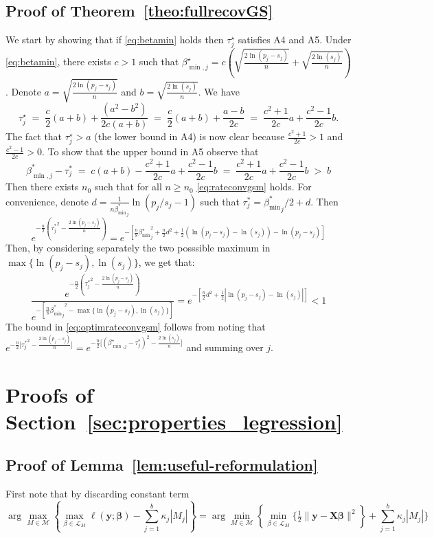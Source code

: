 \documentclass[aos]{imsart}
\theoremstyle{plain}
\newcommand{\bs}{\boldsymbol}
\begin{document}
\begin{supplement}
\subsection{Proof of Theorem~\ref{theo:fullrecovGS}}
We start by showing that if \eqref{eq:betamin} holds then $\tau^\star_j$ satisfies A4 and A5. Under \eqref{eq:betamin}, there exists $c>1$ such that $\beta^\star_{\min,j}=c(\sqrt{\tfrac{2\ln(p_j-s_j)}{n}} + \sqrt{\tfrac{2\ln(s_j)}{n}})$. Denote $a=\sqrt{\tfrac{2\ln(p_j-s_j)}{n}}$ and $b=\sqrt{\tfrac{2\ln(s_j)}{n}}$. We have
$$
\tau_j^\star\;=\;\frac{c}{2} (a+b)+\frac{(a^2-b^2)}{2c(a+b)}\;=\;\frac{c}{2} (a+b)+\frac{a-b}{2c}\;=\;\frac{c^2+1}{2c}a+\frac{c^2-1}{2c}b.
$$
The fact that $\tau^\star_j>a$ (the lower bound in A4) is now clear because $\tfrac{c^2+1}{2c}> 1$  and $\tfrac{c^2-1}{2c}> 0$. To show that the upper bound in A5 observe that
$$
\beta_{\min,j}^* - \tau^*_j \;=\; c(a+b)- \frac{c^2+1}{2c}a+\frac{c^2-1}{2c}b \;= \; \frac{c^2+1}{2c}a+\frac{c^2-1}{2c}b\;>\;  b 
$$
Then there exists $n_0$ such that for all $n\geq n_0$ \eqref{eq:rateconvgsm} holds. For convenience, denote $d = \frac{1}{n {\beta_{\min}^*}_j} \ln (p_j / s_j-1)$ such that $\tau^*_j= {\beta_{\min}^*}_j/2 + d$. Then
$$e^{-\frac{n}{2}\left({\tau^*_j}^2-\frac{2\ln(p_j-s_j)}{n}\right)}
=e^{-\left[\frac{n}{8}{\beta_{\min}^{\star}}_j^2+\frac{n}{2}d^2 + \frac{1}{2}\left(\ln (p_j- s_j)-\ln (s_j)\right) -\ln (p_j- s_j)\right]}$$
Then, by considering separately the two posssible maximum in $\max\{\ln(p_j-s_j),\ln(s_j)\}$, we get that:
$$\frac{e^{-\frac{n}{2}\left({\tau^*_j}^2-\frac{2\ln(p_j-s_j)}{n}\right)}}{e^{-[\frac{n}{8}{{\beta_{\min}^*}_j}^2-\max\{\ln(p_j-s_j),\ln(s_j)\}]}}= 
e^{-\left[\frac{n}{2}d^2 + \frac{1}{2}\left|\ln (p_j- s_j)-\ln (s_j)\right|\right]} <1$$
The bound in \eqref{eq:optimrateconvgsm} follows from noting that $e^{-\tfrac{n}{2}\big[{\tau_j^*}^2-\tfrac{2\ln(p_j-s_j)}{n}\big]}=e^{-\tfrac{n}{2}\big[(\beta^\star_{\min,j}-{\tau_j^*})^2-\tfrac{2\ln(s_j)}{n}\big]}$ and summing over $j$.


\section{Proofs of Section~\ref{sec:properties_legression}}
\subsection{Proof of Lemma~\ref{lem:useful-reformulation}}
	First note that by discarding constant term 
 $$\arg\max_{M\in \mathcal{M}} \left\{\max_{\beta\in \mathcal{L}_M}\ell(\bs y; \bs \beta)-\sum_{j=1}^b\kappa_j |M_j| \right\}=\arg\min_{M\in \mathcal{M}} \left\{\min_{\beta\in \mathcal{L}_M}\bigg\{ \tfrac{1}{2}\|\bs y-\bs X\bs\beta\|^2\right\}+\sum_{j=1}^b\kappa_j |M_j| \bigg\}$$
 

\end{supplement}
\end{document}
